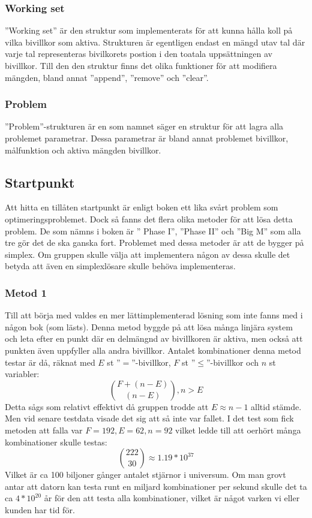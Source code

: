 \subsubsection{Working set}
''Working set'' är den struktur som implementerats för att kunna hålla koll på vilka bivillkor som aktiva. Strukturen är egentligen endast en mängd utav tal där varje tal representeras bivilkorets postion i den toatala uppsättningen av bivillkor. Till den den struktur finns det olika funktioner för att modifiera mängden, bland annat ''append'', ''remove'' och ''clear''.

\subsubsection{Problem}
''Problem''-strukturen är en som namnet säger en struktur för att lagra alla problemet parametrar. Dessa parametrar är bland annat problemet bivillkor, målfunktion och aktiva mängden bivillkor.

\subsection{Startpunkt}
Att hitta en tillåten startpunkt är enligt boken ett lika svårt problem som optimeringsproblemet. Dock så fanns det flera olika metoder för att lösa detta problem. De som nämns i boken är '' Phase I'', ''Phase II'' och ''Big M'' som alla tre gör det de ska ganska fort. Problemet med dessa metoder är att de bygger på simplex. Om gruppen skulle välja att implementera någon av dessa skulle det betyda att även en simplexlösare skulle behöva implementeras. 

\subsubsection{Metod 1}
Till att börja med valdes en mer lättimplementerad lösning som inte fanns med i någon bok (som lästs). Denna metod byggde på att lösa många linjära system och leta efter en punkt där en delmängnd av bivillkoren är aktiva, men också att punkten även uppfyller alla andra bivillkor. Antalet kombinationer denna metod testar är då, räknat med $E$ st ''$=$''-bivillkor, $F$ st ''$\leq$''-bivillkor och $n$ st variabler:
$${F+(n-E) \choose (n-E)}, n>E $$
Detta sågs som relativt effektivt då gruppen trodde att $E \approx n-1$ alltid stämde. Men vid senare testdata visade det sig att så inte var fallet. I det test som fick metoden att falla var $F = 192, E = 62, n = 92$ vilket ledde till att oerhört många kombinationer skulle testas:
$${222 \choose 30} \approx 1.19*10^{37}$$
Vilket är ca 100 biljoner gånger antalet stjärnor i universum. Om man grovt antar att datorn kan testa runt en miljard kombinationer per sekund skulle det ta ca $4*10^{20}$ år för den att testa alla kombinationer, vilket är något varken vi eller kunden har tid för.

